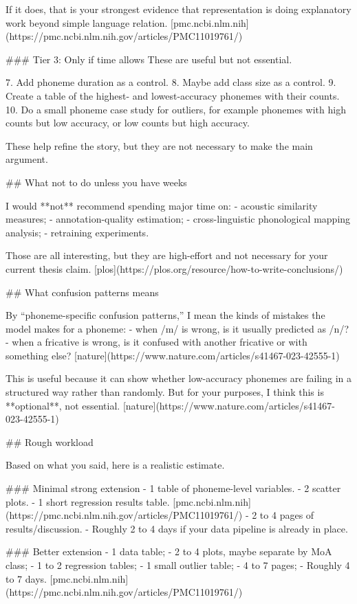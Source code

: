 If it does, that is your strongest evidence that representation is doing explanatory work beyond simple language relation. [pmc.ncbi.nlm.nih](https://pmc.ncbi.nlm.nih.gov/articles/PMC11019761/)

### Tier 3: Only if time allows
These are useful but not essential.

7. Add phoneme duration as a control.
8. Maybe add class size as a control.
9. Create a table of the highest- and lowest-accuracy phonemes with their counts.
10. Do a small phoneme case study for outliers, for example phonemes with high counts but low accuracy, or low counts but high accuracy.

These help refine the story, but they are not necessary to make the main argument.

## What not to do unless you have weeks

I would **not** recommend spending major time on:
- acoustic similarity measures;
- annotation-quality estimation;
- cross-linguistic phonological mapping analysis;
- retraining experiments.

Those are all interesting, but they are high-effort and not necessary for your current thesis claim. [plos](https://plos.org/resource/how-to-write-conclusions/)

## What confusion patterns means

By “phoneme-specific confusion patterns,” I mean the kinds of mistakes the model makes for a phoneme:
- when /m/ is wrong, is it usually predicted as /n/?  
- when a fricative is wrong, is it confused with another fricative or with something else? [nature](https://www.nature.com/articles/s41467-023-42555-1)

This is useful because it can show whether low-accuracy phonemes are failing in a structured way rather than randomly. But for your purposes, I think this is **optional**, not essential. [nature](https://www.nature.com/articles/s41467-023-42555-1)

## Rough workload

Based on what you said, here is a realistic estimate.

### Minimal strong extension
- 1 table of phoneme-level variables.
- 2 scatter plots.
- 1 short regression results table. [pmc.ncbi.nlm.nih](https://pmc.ncbi.nlm.nih.gov/articles/PMC11019761/)
- 2 to 4 pages of results/discussion.
- Roughly 2 to 4 days if your data pipeline is already in place.

### Better extension
- 1 data table;
- 2 to 4 plots, maybe separate by MoA class;
- 1 to 2 regression tables;
- 1 small outlier table;
- 4 to 7 pages;
- Roughly 4 to 7 days. [pmc.ncbi.nlm.nih](https://pmc.ncbi.nlm.nih.gov/articles/PMC11019761/)

